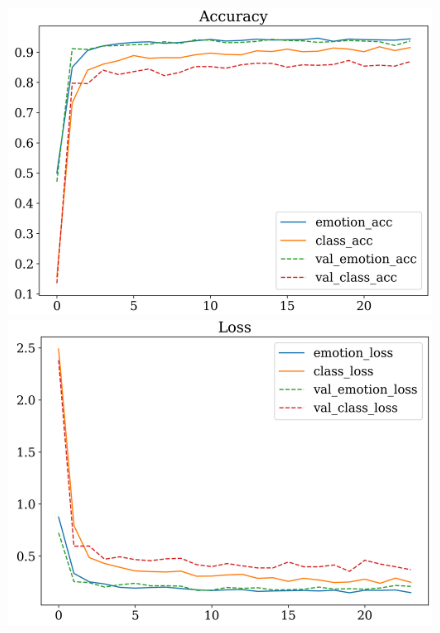 \documentclass[12pt, a4paper, oneside]{ctexart}
\numberwithin{equation}{section}  %
\begin{document}
\begin{figure}[htbp]
    \hspace{-2.5cm}
    \subfigure  %
    {
        \begin{minipage}[b]{.62\linewidth}
            \centering
            \includegraphics[scale=0.5]{acc_dropout0.1.png}
        \end{minipage}
    }
    \subfigure
    {
        \begin{minipage}[b]{.2\linewidth}
            \centering
            \includegraphics[scale=0.5]{loss_dropout0.1.png}
        \end{minipage}
    }
\end{figure}
\vspace{-1cm}
\end{document}
